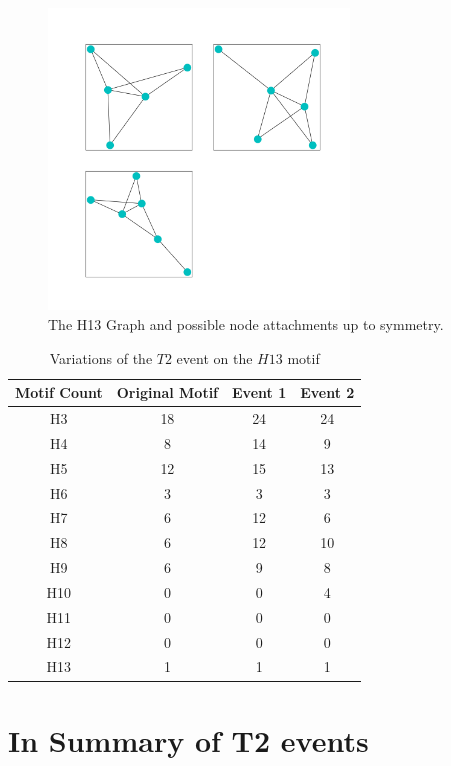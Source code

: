 \begin{figure}[!ht]
    \includegraphics[width=8cm]{Images/H13_evolution.png}
    \centering
    \caption{The H13 Graph and possible node attachments up to symmetry.}
\end{figure}

\begin{table}
    \centering
    \begin{tabular}{||c c c c||} 
    \hline
    Motif Count & Original Motif & Event 1 & Event 2 \\ [0.5ex] 
    \hline\hline
    H3 & 18 & 24 & 24\\ 
    \hline
    H4 & 8 & 14 & 9  \\
    \hline
    H5 & 12 & 15 & 13  \\
    \hline
    H6 & 3 & 3 &3  \\
    \hline
    H7 & 6 & 12 & 6 \\
    \hline
    H8 & 6 & 12 & 10\\
    \hline
    H9 & 6 & 9 & 8 \\
    \hline
    H10 & 0 & 0 & 4  \\
    \hline
    H11 & 0 & 0 & 0  \\
    \hline
    H12 & 0 & 0 & 0 \\
    \hline
    H13 & 1 & 1 & 1 \\
    \hline
   \end{tabular}
   \caption{Variations of the $T2$ event on the $H13$ motif}
   \label{table:11}
\end{table}

\section{In Summary of T2 events}

